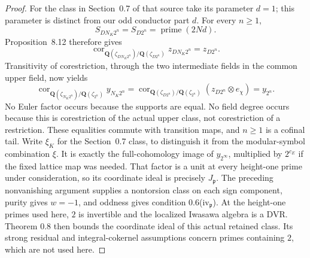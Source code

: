 \begin{proof}
For the class in Section~0.7 of that source take its parameter
$d=1$; this parameter is distinct from our odd conductor part $d$.
For every $n\geq1$,
\[
 S_{DN_K2^n}=S_{D2^n}=\operatorname{prime}(2Nd).
\]
Proposition~8.12 therefore gives
\[
 \operatorname{cor}_{\mathbf Q(\zeta_{DN_K2^n})/
                          \mathbf Q(\zeta_{D2^n})}
             z_{DN_K2^n}=z_{D2^n}.
\]
Transitivity of corestriction, through the two intermediate fields
in the common upper field, now yields
\[
 \operatorname{cor}_{\mathbf Q(\zeta_{N_K2^n})/
                          \mathbf Q(\zeta_{2^n})}y_{N_K2^n}
 =\operatorname{cor}_{\mathbf Q(\zeta_{D2^n})/
                          \mathbf Q(\zeta_{2^n})}
                         (z_{D2^n}\otimes e_\chi)
 =y_{2^n}.
\]
No Euler factor occurs because the supports are equal. No field
degree occurs because this is corestriction of the actual upper
class, not corestriction of a restriction. These equalities commute
with transition maps, and $n\geq1$ is a cofinal tail. Write
$\xi_K$ for the Section~0.7 class, to distinguish it from the
modular-symbol combination $\xi$. It is exactly the full-cohomology
image of $y_{2^\infty}$, multiplied by $2^{c_E}$ if the fixed
lattice map was needed. That factor is a unit at every height-one
prime under consideration, so its coordinate ideal is precisely
$J_{\mathfrak p}$. The preceding
nonvanishing argument supplies a nontorsion class on each sign
component, purity gives $w=-1$, and oddness gives condition
0.6(iv$_{\mathfrak p}$). At the height-one primes used here, $2$ is
invertible and the localized Iwasawa algebra is a DVR. Theorem 0.8
then bounds the coordinate ideal of this actual retained class. Its
strong residual and integral-cokernel assumptions concern primes
containing $2$, which are not used here.


\end{proof}
